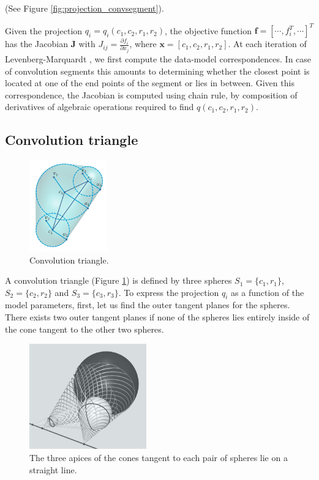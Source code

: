 \documentclass[10pt,journal,a4paper]{IEEEtran}
\begin{document}
(See Figure \ref{fig:projection_convsegment}).

Given the projection $q_i = q_i(c_1, c_2, r_1, r_2)$, the objective function $\textbf{f} = [\cdots, f_i^T, \cdots]^T$  has the Jacobian $\textbf{J}$ with $J_{ij} = \frac{\partial{f_i}}{\partial{x_j}}$, where $\textbf{x} = [c_1, c_2, r_1, r_2]$.  At each iteration of Levenberg-Marquardt , we first compute the data-model correspondences. In case of convolution segments this amounts to determining whether the closest point is located at one of the end points of the segment or lies in between. Given this correspondence, the Jacobian is computed using chain rule, by composition of derivatives of algebraic operations required to find $q(c_1, c_2, r_1, r_2)$.




\subsection{Convolution triangle}


\begin{figure}[h!] 
	\centering
	\hspace{-2em}
	\includegraphics[width=0.3\textwidth]{figures/convtriangle.png}
	\caption{Convolution triangle.}
	\label{fig:convtriangle}
\end{figure}

A convolution triangle (Figure \ref{fig:convtriangle}) is defined by three spheres $S_1 = \{c_1, r_1\}$, $S_2 = \{c_2, r_2\}$ and $S_3 = \{c_3, r_3\}$. To express the projection $q_i$ as a function of the model parameters, first, let us find the outer tangent planes for the spheres. There exists two outer tangent planes if none of the spheres lies entirely inside of the cone tangent to the other two spheres. 

\begin{figure}[h!] 
	\centering
	\hspace{-2em}
	\includegraphics[width=0.45\textwidth]{figures/cones_and_tangent_plane.png}
	\caption{The three apices of the cones tangent to each pair of spheres lie on a straight line.}
	\label{fig:logistic_regression}
\end{figure}
\end{document}
